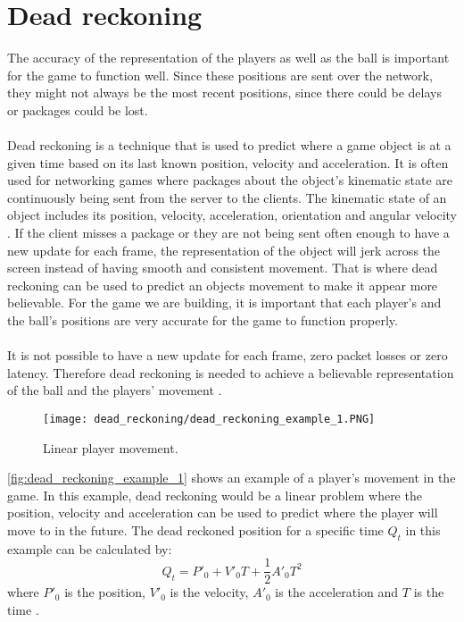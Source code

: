 \section{Dead reckoning}
The accuracy of the representation of the players as well as the ball is important for the game to function well.
Since these positions are sent over the network, they might not always be the most recent positions, since there could be delays or packages could be lost.
\\\\
Dead reckoning is a technique that is used to predict where a game object is at a given time based on its last known position, velocity and acceleration.
It is often used for networking games where packages about the object's kinematic state are continuously being sent from the server to the clients.
The kinematic state of an object includes its position, velocity, acceleration, orientation and angular velocity \autocite{DeadReckoning}.
If the client misses a package or they are not being sent often enough to have a new update for each frame, the representation of the object will jerk across the screen instead of having smooth and consistent movement.
That is where dead reckoning can be used to predict an objects movement to make it appear more believable.
For the game we are building, it is important that each player's and the ball's positions are very accurate for the game to function properly.
\\\\
It is not possible to have a new update for each frame, zero packet losses or zero latency. 
Therefore dead reckoning is needed to achieve a believable representation of the ball and the players' movement \autocite{DeadReckoning}.
\begin{figure}[H]
    \centering
    \texttt{[image: dead\_reckoning/dead\_reckoning\_example\_1.PNG]}
    \caption{Linear player movement.}
    \label{fig:dead_reckoning_example_1}
\end{figure}
\noindent
\autoref{fig:dead_reckoning_example_1} shows an example of a player's movement in the game.
In this example, dead reckoning would be a linear problem where the position, velocity and acceleration can be used to predict where the player will move to in the future. 
The dead reckoned position for a specific time $Q_t$ in this example can be calculated by:
\begin{displaymath}
    Q_t = P'_0 + V'_0T + \frac{1}{2}A'_0T^2
\end{displaymath}
where $ P'_0 $ is the position, $ V'_0 $ is the velocity, $ A'_0 $ is the acceleration and $T$ is the time \autocite{DeadReckoning}.

